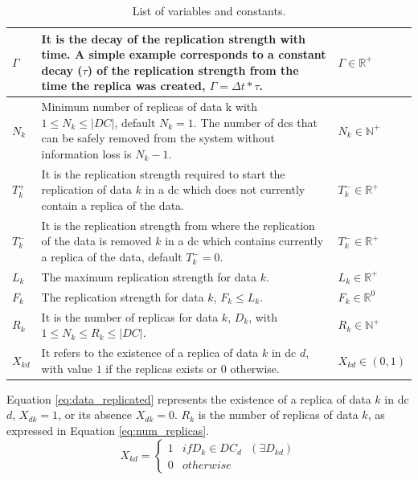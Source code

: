 \documentclass{acm_proc_article-sp}
\begin{document}
\begin{table}[ht!]
\begin{tabular}{ |l|p{13.5cm}|l|}
		\hline
		$\Gamma$      & It is the decay of the replication strength with time. A simple example corresponds to a constant decay ($\tau$) of the replication strength from the time the replica was created, $\Gamma = \Delta t * \tau$. & $\Gamma \in \mathbb{R}^{+}$ \\
		\hline
		$N_{k}$           & Minimum number of replicas of data k with $1 \le N_{k} \le |DC|$, default $N_{k} = 1$. The number of \glspl{dc} that can be safely removed from the system without information loss is $N_{k} -1$. & $N_{k} \in \mathbb{N}^{+}$ \\
		\hline
		$T^{+}_{k}$       & It is the replication strength required to start the replication of data $k$ in a \gls{dc} which does not currently contain a replica of the data. & $T^{-}_{k} \in \mathbb{R}^{+}$ \\
		\hline
		$T^{-}_{k}$       & It is the replication strength from where the replication of the data is removed $k$ in a \gls{dc} which contains currently a replica of the data, default $T^{-}_{k} = 0$. & $T^{-}_{k} \in \mathbb{R}^{+}$ \\
		\hline
		$L_{k}$            & The maximum replication strength for data $k$. & $L_{k} \in \mathbb{R}^{+}$ \\
		\hline
		$F_{k}$            & The replication strength for data $k$, $F_{k} \le L_{k}$. & $F_{k} \in \mathbb{R}^{0}$ \\
		\hline
		$R_{k}$            & It is the number of replicas for data $k$, $D_{k}$, with $1 \le N_{k} \le R_{k} \le |DC|$. & $R_{k} \in \mathbb{N}^{+}$ \\
		\hline
		$X_{kd}$            & It refers to the existence of a replica of data $k$ in \gls{dc} $d$, with value $1$ if the replicas exists or $0$ otherwise. & $X_{kd} \in (0, 1)$\\
		\hline
	\end{tabular}
	
	\caption{List of variables and constants.}
	\label{tbl:vars_consts}
\end{table}

Equation \ref{eq:data_replicated} represents the existence of a replica of data $k$ in \gls{dc} $d$, $X_{dk} = 1$, or its absence $X_{dk} = 0$. $R_{k}$ is the number of replicas of data $k$, as expressed in Equation \ref{eq:num_replicas}.
\begin{equation} \label{eq:data_replicated}
	X_{kd} = \left\{
		\begin{array}{ll}
			1 & if D_{k} \in DC_{d} \text{ } (\exists D_{kd})\\
			0 & otherwise
		\end{array}
	\right.
\end{equation}
\end{document}
